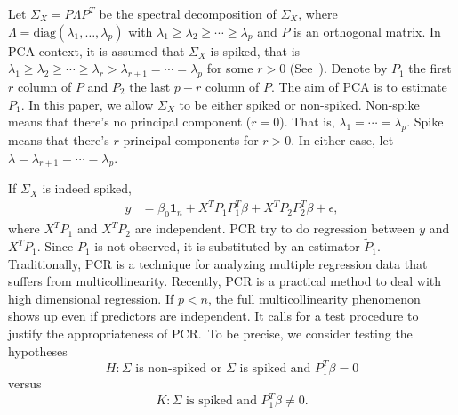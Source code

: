 \documentclass[review]{elsarticle}
\theoremstyle{plain}
\theoremstyle{definition}
\theoremstyle{remark}
\begin{document}
Let $\Sigma_X=P\Lambda P^T$ be the spectral decomposition of $\Sigma_X$, where $\Lambda=\textrm{diag}(\lambda_1,\ldots,\lambda_p)$ with $\lambda_1\geq \lambda_2\geq \cdots \geq \lambda_p$ and $P$ is an orthogonal matrix.
In PCA context, it is assumed that $\Sigma_X$ is spiked, that is $\lambda_1\geq \lambda_2\geq \cdots \geq\lambda_r> \lambda_{r+1}=\cdots =\lambda_p$ for some $r>0$
(See~\cite{Cai2012Sparse}). Denote by $P_1$ the first $r$ column of $P$ and $P_2$ the last $p-r$ column of $P$. The aim of PCA is to estimate $P_1$.
In this paper, we allow $\Sigma_X$ to be either spiked or non-spiked. Non-spike means that there's no principal component ($r=0$). That is, $\lambda_1=\cdots = \lambda_p$. Spike means that there's $r$ principal components for $r>0$. 
In either case, let $\lambda=\lambda_{r+1}=\cdots=\lambda_{p}$.

If $\Sigma_X$ is indeed spiked,
\begin{equation}
    \begin{aligned}
        y&=\beta_0 \textbf{1}_n+X^T P_1P_1^T\beta+X^T P_2 P_2^T\beta+\epsilon,
    \end{aligned}
\end{equation}
where $X^T P_1$ and $X^T P_2$ are independent.
PCR try to do regression between $y$ and $X^T P_1$. Since $P_1$ is not observed, it is substituted by an estimator $\tilde{P}_1$. 
Traditionally, PCR is a technique for analyzing multiple regression data that suffers from multicollinearity. Recently, PCR is a practical method to deal with high dimensional regression. If $p<n$, the full multicollinearity phenomenon shows up even if predictors are independent. 
It calls for a test procedure to justify the appropriateness of PCR.\ 
To be precise, we consider testing the hypotheses
\begin{equation}
    H:\Sigma\,\,\textrm{is non-spiked or}\,\,\Sigma\,\,\textrm{is spiked and}\,\, P_1^T \beta =0 
\end{equation}
versus
\begin{equation}
    K: \Sigma\,\,\textrm{is spiked and}\,\, P_1^T \beta \neq 0.
\end{equation}
\end{document}

